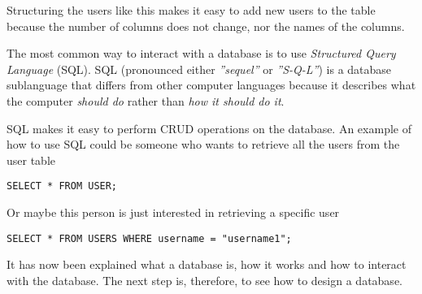 Structuring the users like this makes it easy to add new users to the table because the number of columns does not change, nor the names of the columns.

The most common way to interact with a database is to use \textit{Structured Query Language} (SQL).
SQL (pronounced either \textit{''sequel''} or \textit{''S-Q-L''}) is a database sublanguage that differs from other computer languages because it describes what the computer \textit{should do} rather than \textit{how it should do it}.\cite{SQLIntroduction}

SQL makes it easy to perform CRUD operations on the database.\cite{OracleWhatIsDatabase}
An example of how to use SQL could be someone who wants to retrieve all the users from the user table

\begin{lstlisting}
SELECT * FROM USER;
\end{lstlisting}

Or maybe this person is just interested in retrieving a specific user

\begin{lstlisting}
SELECT * FROM USERS WHERE username = "username1";
\end{lstlisting}

It has now been explained what a database is, how it works and how to interact with the database.
The next step is, therefore, to see how to design a database.


